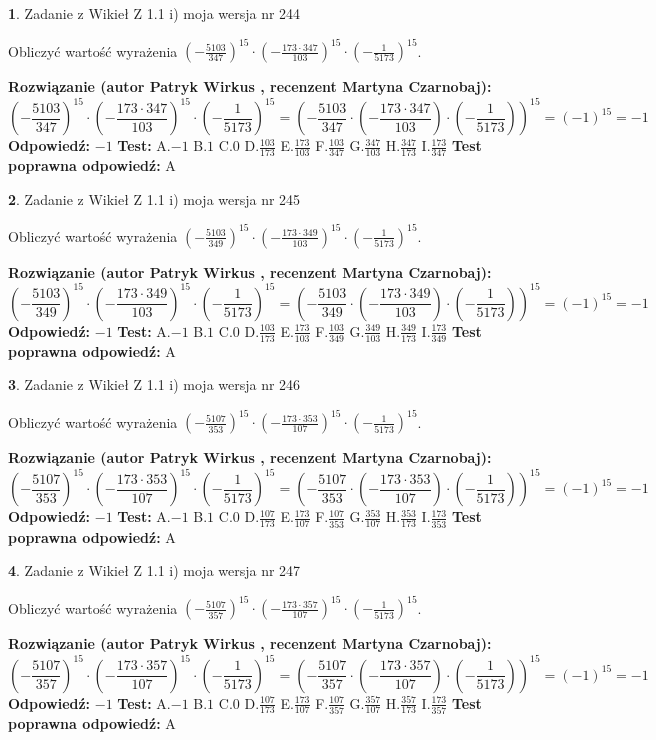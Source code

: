 \documentclass[12pt, a4paper]{article}
\theoremstyle{definition} %
\newtheorem{zad}{}
\newcommand{\zadStart}[1]{\begin{zad}#1\newline}
\newcommand{\zadStop}{\end{zad}}
\newcommand{\rozwStart}[2]{\noindent \textbf{Rozwiązanie (autor #1 , recenzent #2): }\newline}
\newcommand{\rozwStop}{\newline}
\newcommand{\odpStart}{\noindent \textbf{Odpowiedź:}\newline}
\newcommand{\odpStop}{\newline}
\newcommand{\testStart}{\noindent \textbf{Test:}\newline}
\newcommand{\testStop}{\newline}
\newcommand{\kluczStart}{\noindent \textbf{Test poprawna odpowiedź:}\newline}
\newcommand{\kluczStop}{\newline}
\begin{document}
\zadStart{Zadanie z Wikieł Z 1.1 i) moja wersja nr 244}

Obliczyć wartość wyrażenia $(-\frac{5103}{347})^{15} \cdot (-\frac{173 \cdot 347}{103})^{15} \cdot (-\frac{1}{5173})^{15}$.
\zadStop
\rozwStart{Patryk Wirkus}{Martyna Czarnobaj}
$$(-\frac{5103}{347})^{15} \cdot (-\frac{173 \cdot 347}{103})^{15} \cdot (-\frac{1}{5173})^{15} = (-\frac{5103}{347} \cdot (-\frac{173 \cdot 347}{103}) \cdot (-\frac{1}{5173}))^{15} = (-1)^{15} = -1$$
\rozwStop
\odpStart
$-1$
\odpStop
\testStart
A.$-1$ B.$1$ C.$0$ D.$\frac{103}{173}$ E.$\frac{173}{103}$
F.$\frac{103}{347}$ G.$\frac{347}{103}$
H.$\frac{347}{173}$
I.$\frac{173}{347}$
\testStop
\kluczStart
A
\kluczStop



\zadStart{Zadanie z Wikieł Z 1.1 i) moja wersja nr 245}

Obliczyć wartość wyrażenia $(-\frac{5103}{349})^{15} \cdot (-\frac{173 \cdot 349}{103})^{15} \cdot (-\frac{1}{5173})^{15}$.
\zadStop
\rozwStart{Patryk Wirkus}{Martyna Czarnobaj}
$$(-\frac{5103}{349})^{15} \cdot (-\frac{173 \cdot 349}{103})^{15} \cdot (-\frac{1}{5173})^{15} = (-\frac{5103}{349} \cdot (-\frac{173 \cdot 349}{103}) \cdot (-\frac{1}{5173}))^{15} = (-1)^{15} = -1$$
\rozwStop
\odpStart
$-1$
\odpStop
\testStart
A.$-1$ B.$1$ C.$0$ D.$\frac{103}{173}$ E.$\frac{173}{103}$
F.$\frac{103}{349}$ G.$\frac{349}{103}$
H.$\frac{349}{173}$
I.$\frac{173}{349}$
\testStop
\kluczStart
A
\kluczStop



\zadStart{Zadanie z Wikieł Z 1.1 i) moja wersja nr 246}

Obliczyć wartość wyrażenia $(-\frac{5107}{353})^{15} \cdot (-\frac{173 \cdot 353}{107})^{15} \cdot (-\frac{1}{5173})^{15}$.
\zadStop
\rozwStart{Patryk Wirkus}{Martyna Czarnobaj}
$$(-\frac{5107}{353})^{15} \cdot (-\frac{173 \cdot 353}{107})^{15} \cdot (-\frac{1}{5173})^{15} = (-\frac{5107}{353} \cdot (-\frac{173 \cdot 353}{107}) \cdot (-\frac{1}{5173}))^{15} = (-1)^{15} = -1$$
\rozwStop
\odpStart
$-1$
\odpStop
\testStart
A.$-1$ B.$1$ C.$0$ D.$\frac{107}{173}$ E.$\frac{173}{107}$
F.$\frac{107}{353}$ G.$\frac{353}{107}$
H.$\frac{353}{173}$
I.$\frac{173}{353}$
\testStop
\kluczStart
A
\kluczStop



\zadStart{Zadanie z Wikieł Z 1.1 i) moja wersja nr 247}

Obliczyć wartość wyrażenia $(-\frac{5107}{357})^{15} \cdot (-\frac{173 \cdot 357}{107})^{15} \cdot (-\frac{1}{5173})^{15}$.
\zadStop
\rozwStart{Patryk Wirkus}{Martyna Czarnobaj}
$$(-\frac{5107}{357})^{15} \cdot (-\frac{173 \cdot 357}{107})^{15} \cdot (-\frac{1}{5173})^{15} = (-\frac{5107}{357} \cdot (-\frac{173 \cdot 357}{107}) \cdot (-\frac{1}{5173}))^{15} = (-1)^{15} = -1$$
\rozwStop
\odpStart
$-1$
\odpStop
\testStart
A.$-1$ B.$1$ C.$0$ D.$\frac{107}{173}$ E.$\frac{173}{107}$
F.$\frac{107}{357}$ G.$\frac{357}{107}$
H.$\frac{357}{173}$
I.$\frac{173}{357}$
\testStop
\kluczStart
A
\kluczStop
\end{document}
